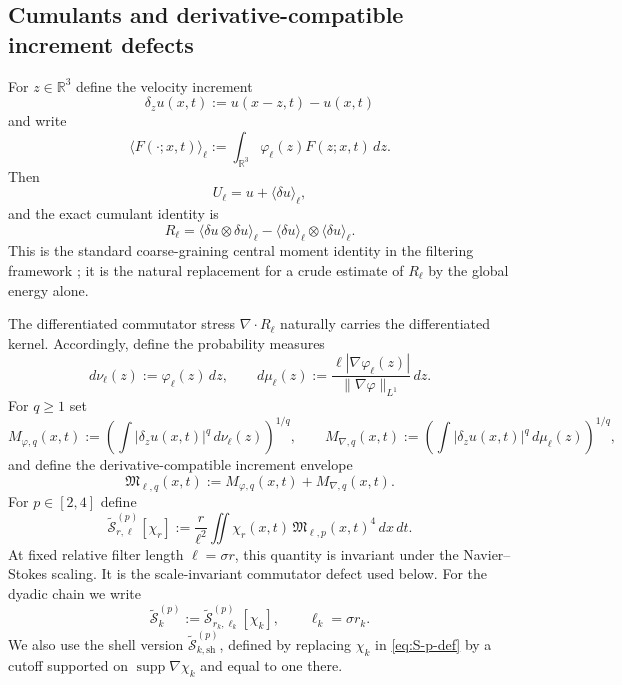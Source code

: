 \documentclass[11pt]{article}
\numberwithin{equation}{section}
\theoremstyle{plain}
\theoremstyle{definition}
\theoremstyle{remark}
\DeclareMathOperator{\supp}{supp}
\newcommand{\R}{\mathbb R}
\begin{document}
\subsection{Cumulants and derivative-compatible increment defects}

For $z\in\R^3$ define the velocity increment
\[
\delta_z u(x,t):=u(x-z,t)-u(x,t)
\]
and write
\[
\langle F(\cdot;x,t)\rangle_\ell
:=\int_{\R^3}\varphi_\ell(z)F(z;x,t)\,dz.
\]
Then
\[
U_\ell=u+\langle \delta u\rangle_\ell,
\]
and the exact cumulant identity is
\begin{equation}\label{eq:cumulant-R}
R_\ell
=
\langle \delta u\otimes\delta u\rangle_\ell
-
\langle\delta u\rangle_\ell\otimes\langle\delta u\rangle_\ell .
\end{equation}
This is the standard coarse-graining central moment identity in the filtering framework \cite{Germano1992,EyinkAluie2009}; it is the natural replacement for a crude estimate of $R_\ell$ by the global energy alone.

The differentiated commutator stress $\nabla\!\cdot R_\ell$ naturally carries the differentiated kernel.  Accordingly, define the probability measures
\begin{equation}\label{eq:nu-mu-def}
d\nu_\ell(z):=\varphi_\ell(z)\,dz,
\qquad
 d\mu_\ell(z):=
\frac{\ell|\nabla\varphi_\ell(z)|}{\|\nabla\varphi\|_{L^1}}\,dz.
\end{equation}
For $q\ge1$ set
\begin{equation}\label{eq:Mphi-Mgrad-def}
M_{\varphi,q}(x,t):=
\left(\int |\delta_z u(x,t)|^q\,d\nu_\ell(z)\right)^{1/q},
\qquad
M_{\nabla,q}(x,t):=
\left(\int |\delta_z u(x,t)|^q\,d\mu_\ell(z)\right)^{1/q},
\end{equation}
and define the derivative-compatible increment envelope
\begin{equation}\label{eq:M-envelope-def}
\mathfrak M_{\ell,q}(x,t):=M_{\varphi,q}(x,t)+M_{\nabla,q}(x,t).
\end{equation}
For $p\in[2,4]$ define
\begin{equation}\label{eq:S-p-def}
\widetilde{\mathcal S}_{r,\ell}^{(p)}[\chi_r]
:=
\frac r{\ell^2}
\iint \chi_r(x,t)\,\mathfrak M_{\ell,p}(x,t)^4\,dx\,dt.
\end{equation}
At fixed relative filter length $\ell=\sigma r$, this quantity is invariant under the Navier--Stokes scaling.  It is the scale-invariant commutator defect used below.  For the dyadic chain we write
\begin{equation}\label{eq:Skp-def}
\widetilde{\mathcal S}_k^{(p)}
:=\widetilde{\mathcal S}_{r_k,\ell_k}^{(p)}[\chi_k],
\qquad
\ell_k=\sigma r_k.
\end{equation}
We also use the shell version $\widetilde{\mathcal S}_{k,\mathrm{sh}}^{(p)}$, defined by replacing $\chi_k$ in \eqref{eq:S-p-def} by a cutoff supported on $\supp\nabla\chi_k$ and equal to one there.
\end{document}
